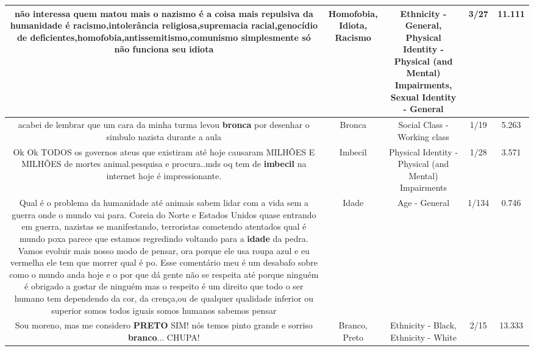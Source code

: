 \documentclass[11pt]{article}
\newlength\mylength
\begin{document}
\begin{center}
\begin{longtable}{|C{.65\mylength}|C{.30\mylength}|C{.12\mylength}|C{.12\mylength}|C{.12\mylength}|}
  \small não interessa quem matou mais o nazismo é a coisa mais repulsiva da humanidade é \textbf{racismo},intolerância religiosa,supremacia racial,genocídio de deficientes,\textbf{homofobia},antissemitismo,comunismo simplesmente só não funciona seu idiota\normalsize   & Homofobia, Idiota, Racismo & Ethnicity - General, Physical Identity - Physical (and Mental) Impairments, Sexual Identity - General & 3/27 & 11.111 \\  \hline
  \small acabei de lembrar que um cara da minha turma levou \textbf{bronca} por desenhar o simbulo nazista durante a aula\normalsize   & Bronca & Social Class - Working class & 1/19 & 5.263 \\  \hline
  \small Ok Ok TODOS os governos ateus que existiram até hoje causaram MILHÕES E MILHÕES de mortes animal.pesquisa e procura..mds oq tem de \textbf{imbecil} na internet hoje é impressionante.\normalsize   & Imbecil & Physical Identity - Physical (and Mental) Impairments & 1/28 & 3.571 \\  \hline
  \small Qual é o problema da humanidade até animais sabem lidar com a vida sem a guerra onde o mundo vai para. Coreia do Norte e Estados Unidos quase entrando em guerra, nazistas se manifestando, terroristas cometendo atentados qual é mundo poxa parece que estamos regredindo voltando para a \textbf{idade} da pedra. Vamos evoluir mais nosso modo de pensar, ora porque ele usa roupa azul e eu vermelha ele tem que morrer qual é po. Esse comentário meu é um desabafo sobre como o mundo anda hoje e o por que dá gente não se respeita até porque ninguém é obrigado a gostar de ninguém mas o respeito é um direito que todo o ser humano tem dependendo da cor, da crença,ou de qualquer qualidade inferior ou superior somos todos iguais somos humanos sabemos pensar\normalsize   & Idade & Age - General & 1/134 & 0.746 \\  \hline
  \small Sou moreno, mas me considero \textbf{PRETO} SIM! nós temos pinto grande e sorriso \textbf{branco}... CHUPA!\normalsize   & Branco, Preto & Ethnicity - Black, Ethnicity - White & 2/15 & 13.333 \\  \hline

\end{longtable}
\end{center}
\end{document}
